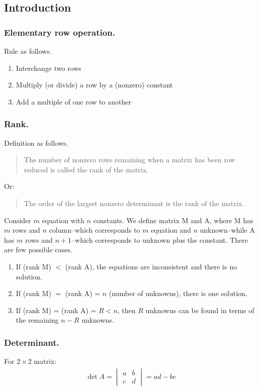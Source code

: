 \documentclass[../main.tex]{subfiles}
\begin{document}
\subsection*{Introduction}
\subsubsection*{Elementary row operation.} Rule as follows.
\begin{enumerate}
    \item Interchange two rows 
    \item Multiply (or divide) a row by a (nonzero) constant 
    \item Add a multiple of one row to another
\end{enumerate}

\subsubsection*{Rank.} Definition as follows.
\begin{quote}
    The number of nonzero rows remaining when a matrix has been row reduced is called the rank of the matrix.
\end{quote}
Or:
\begin{quote}
    The order of the largest nonzero determinant is the rank of the matrix. 
\end{quote}

Consider $m$ equation with $n$ constants. We define matrix M and A, where M has $m$ rows and $n$ column--which corresponds to $m$ equation and $n$ unknown--while A has $m$ rows and $n+1$--which corresponds to unknown plus the constant. There are few possible cases.
\begin{enumerate}
    \item If (rank M) $<$ (rank A), the equations are inconsistent and there is no solution.
    \item If (rank M) $=$ (rank A) = $n$ (number of unknowns), there is one solution.
    \item If (rank M) = (rank A) = $R < n$, then $R$ unknowns can be found in terms of the remaining $n-R$ unknowns.
\end{enumerate}

\subsubsection*{Determinant.} For $2\times 2$ matrix:
\begin{align*}
    \det A=\begin{vmatrix}
        a&b\\
        c&d
    \end{vmatrix}=ad-bc
\end{align*}
\end{document}
